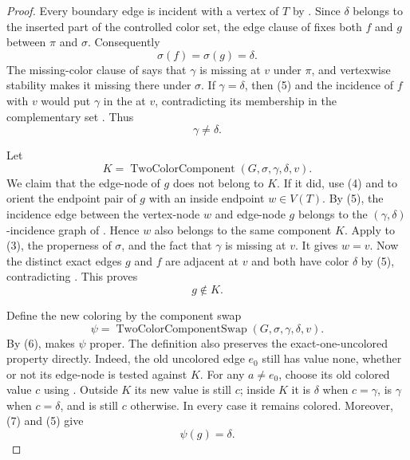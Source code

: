 \begin{proof}
Every boundary edge is incident with a vertex of \(T\) by
.  Since \(\delta\) belongs to the inserted part
of the controlled color set, the edge clause of
 fixes both \(f\) and \(g\) between \(\pi\) and
\(\sigma\).  Consequently
\[
                       \sigma(f)=\sigma(g)=\delta.             \tag{5}
\]
The missing-color clause of  says that
\(\gamma\) is missing at \(v\) under \(\pi\), and vertexwise stability
makes it missing there under \(\sigma\).  If \(\gamma=\delta\), then
(5) and the incidence of \(f\) with \(v\) would put \(\gamma\) in the
 at \(v\), contradicting its membership in the
complementary set .  Thus
\[
                              \gamma\ne\delta.                 \tag{6}
\]

Let
\[
 K=\operatorname{TwoColorComponent}(G,\sigma,\gamma,\delta,v).
\]
We claim that the edge-node of \(g\) does not belong to \(K\).  If it
did, use (4) and  to orient the endpoint pair of
\(g\) with an inside endpoint \(w\in V(T)\).  By (5), the incidence
edge between the vertex-node \(w\) and edge-node \(g\) belongs to the
\((\gamma,\delta)\)-incidence graph of
.  Hence \(w\) also belongs to the same
component \(K\).  Apply
 to (3), the properness of
\(\sigma\), and the fact that \(\gamma\) is missing at \(v\).  It gives
\(w=v\).  Now the distinct exact edges \(g\) and \(f\) are adjacent at
\(v\) and both have color \(\delta\) by (5), contradicting
.  This proves
\[
                              g\notin K.                        \tag{7}
\]

Define the new coloring by the component swap
\[
             \psi=\operatorname{TwoColorComponentSwap}
                    (G,\sigma,\gamma,\delta,v).
\]
By (6),  makes \(\psi\) proper.
The definition  also preserves the
exact-one-uncolored property directly.  Indeed, the old uncolored edge
\(e_0\) still has value \(\mathrm{none}\), whether or not its edge-node
is tested against \(K\).  For any \(a\ne e_0\), choose its old colored
value \(c\) using .  Outside \(K\) its new
value is still \(c\); inside \(K\) it is \(\delta\) when
\(c=\gamma\), is \(\gamma\) when \(c=\delta\), and is still \(c\)
otherwise.  In every case it remains colored.  Moreover, (7) and (5)
give
\[
                              \psi(g)=\delta.                   \tag{8}
\]


\end{proof}
